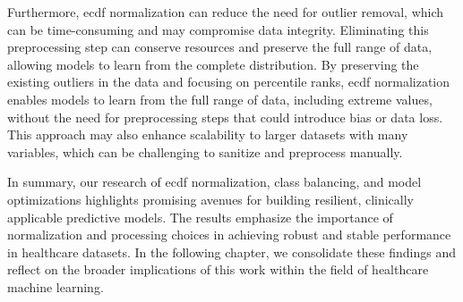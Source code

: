 Furthermore, \gls{ecdf} normalization can reduce the need for outlier removal, which can be time-consuming and may compromise data integrity. Eliminating this preprocessing step can conserve resources and preserve the full range of data, allowing models to learn from the complete distribution. By preserving the existing outliers in the data and focusing on percentile ranks, \gls{ecdf} normalization enables models to learn from the full range of data, including extreme values, without the need for preprocessing steps that could introduce bias or data loss. This approach may also enhance scalability to larger datasets with many variables, which can be challenging to sanitize and preprocess manually.


In summary, our research of \gls{ecdf} normalization, class balancing, and model optimizations highlights promising avenues for building resilient, clinically applicable predictive models. The results emphasize the importance of normalization and processing choices in achieving robust and stable performance in healthcare datasets. In the following chapter, we consolidate these findings and reflect on the broader implications of this work within the field of healthcare machine learning.
